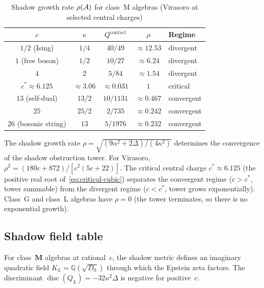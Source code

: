 \begin{table}[ht]
\centering
\caption{Shadow growth rate $\rho(\mathcal{A})$ for class~M algebras
(Virasoro at selected central charges)}
\label{tab:growth-rate}
\renewcommand{\arraystretch}{1.35}
{\small
\begin{tabular}{ccccl}
\toprule
$c$
 & $\kappa$
 & $Q^{\mathrm{contact}}$
 & $\rho$
 & \textbf{Regime} \\
\midrule
$1/2$ (Ising)
 & $1/4$ & $40/49$ & $\approx 12.53$ & divergent \\
$1$ (free boson)
 & $1/2$ & $10/27$ & $\approx 6.24$ & divergent \\
$4$
 & $2$ & $5/84$ & $\approx 1.54$ & divergent \\
$c^* \approx 6.125$
 & $\approx 3.06$ & $\approx 0.031$ & $1$ & critical \\
$13$ (self-dual)
 & $13/2$ & $10/1131$ & $\approx 0.467$ & convergent \\
$25$
 & $25/2$ & $2/735$ & $\approx 0.242$ & convergent \\
$26$ (bosonic string)
 & $13$ & $5/1976$ & $\approx 0.232$ & convergent \\
\bottomrule
\end{tabular}
}
\end{table}

\noindent
The shadow growth rate $\rho = \sqrt{(9\alpha^2 + 2\Delta)/(4\kappa^2)}$
determines the convergence of the shadow obstruction tower. For Virasoro,
$\rho^2 = (180c + 872)/[c^2(5c+22)]$. The critical central charge
$c^* \approx 6.125$ (the positive real root of~\eqref{eq:critical-cubic})
separates the convergent regime ($c > c^*$, tower summable) from the
divergent regime ($c < c^*$, tower grows exponentially). Class~G and
class~L algebras have $\rho = 0$ (the tower terminates, so there is no
exponential growth).

\subsection{Shadow field table}\label{ssec:shadow-field-table}

For class~$\mathbf{M}$ algebras at rational~$c$, the shadow metric
defines an imaginary quadratic field $K_L = \mathbb{Q}(\sqrt{D_0})$
through which the Epstein zeta factors. The discriminant
$\operatorname{disc}(Q_L) = -32\kappa^2\Delta$ is negative for
positive~$c$.

